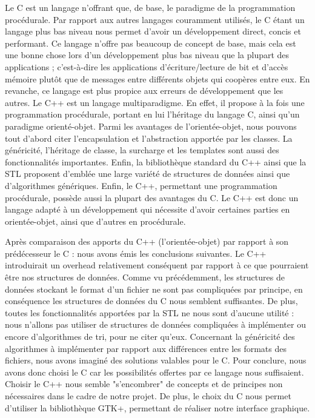 \documentclass[11pt]{article}
\begin{document}
Le C est un langage n’offrant que, de base, le paradigme de la programmation 
procédurale. Par rapport aux autres langages couramment utilisés, le C étant 
un langage plus bas niveau nous permet d’avoir un développement direct, 
concis et performant. Ce langage n’offre pas beaucoup de concept de base, 
mais cela est une bonne chose lors d’un développement plus bas niveau que 
la plupart des applications ; c’est-à-dire les applications 
d’écriture/lecture de bit et d’accès mémoire plutôt que de messages entre 
différents objets qui coopères entre eux. En revanche, ce langage est plus 
propice aux erreurs de développement que les autres.
Le C++ est un langage multiparadigme. En effet, il propose à la fois une 
programmation procédurale, portant en lui l’héritage du langage C, ainsi 
qu'un paradigme orienté-objet. Parmi les avantages de l’orientée-objet, 
nous pouvons tout d’abord citer l’encapsulation et l’abstraction apportée 
par les classes. La généricité, l’héritage de classe, la surcharge et les 
templates sont aussi des fonctionnalités importantes. 
Enfin, la bibliothèque standard du C++ ainsi que la STL proposent d’emblée 
une large variété de structures de données ainsi que d’algorithmes génériques. 
Enfin, le C++, permettant une programmation procédurale, possède aussi la 
plupart des avantages du C. Le C++ est donc un langage adapté à un développement 
qui nécessite d’avoir certaines parties en orientée-objet, ainsi que d’autres 
en procédurale.

Après comparaison des apports du C++ (l’orientée-objet) par rapport à son 
prédécesseur le C : nous avons émis les conclusions suivantes. Le C++ introduirait 
un overhead relativement conséquent par rapport à ce que pourraient être nos 
structures de données. Comme vu précédemment, les structures de données 
stockant le format d’un fichier ne sont pas compliquées par principe, en 
conséquence les structures de données du C nous semblent suffisantes. 
De plus, toutes les fonctionnalités apportées par la STL ne nous sont 
d’aucune utilité : nous n’allons pas utiliser de structures de données 
compliquées à implémenter ou encore d’algorithmes de tri, pour ne citer 
qu’eux. Concernant la généricité des algorithmes à implémenter par rapport 
aux différences entre les formats des fichiers, nous avons imaginé des 
solutions valables pour le C.
Pour conclure, nous avons donc choisi le C car les possibilités offertes 
par ce langage nous suffisaient. Choisir le C++ nous semble "s’encombrer" 
de concepts et de principes non nécessaires dans le cadre de notre projet. 
De plus, le choix du C nous permet d’utiliser la bibliothèque GTK+, 
permettant de réaliser notre interface graphique. 
\small
\end{document}
